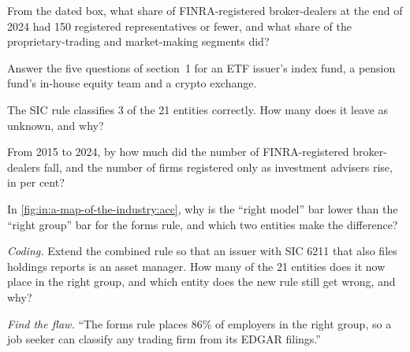 \begin{exercise}[$\star$]\label{exo:in:a-map-of-the-industry:2}
From the dated box, what share of FINRA-registered broker-dealers at the end of 2024 had 150 registered representatives or
fewer, and what share of the proprietary-trading and market-making segments did?
\end{exercise}

\begin{exercise}[$\star$]\label{exo:in:a-map-of-the-industry:3}
Answer the five questions of section~1 for an ETF issuer's index fund, a pension fund's in-house equity team and a
crypto exchange.
\end{exercise}

\begin{exercise}[$\star\star$]\label{exo:in:a-map-of-the-industry:4}
The SIC rule classifies 3 of the 21 entities correctly. How many does it leave as unknown, and why?
\end{exercise}

\begin{exercise}[$\star\star$]\label{exo:in:a-map-of-the-industry:5}
From 2015 to 2024, by how much did the number of FINRA-registered broker-dealers fall, and the number of firms
registered only as investment advisers rise, in per cent?
\end{exercise}

\begin{exercise}[$\star\star$]\label{exo:in:a-map-of-the-industry:6}
In \cref{fig:in:a-map-of-the-industry:acc}, why is the ``right model'' bar lower than the ``right group'' bar for the
forms rule, and which two entities make the difference?
\end{exercise}

\begin{exercise}[$\star\star\star$]\label{exo:in:a-map-of-the-industry:7}
\emph{Coding.} Extend the combined rule so that an issuer with SIC 6211 that also files holdings reports is an asset
manager. How many of the 21 entities does it now place in the right group, and which entity does the new rule still get
wrong, and why?
\end{exercise}

\begin{exercise}[$\star\star\star$]\label{exo:in:a-map-of-the-industry:8}
\emph{Find the flaw.} ``The forms rule places 86\% of employers in the right group, so a job seeker can classify any
trading firm from its EDGAR filings.''
\end{exercise}


